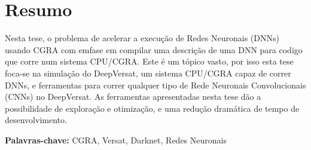 
\section*{Resumo}



Nesta tese, o problema de acelerar a execução de Redes Neuronais (DNNs) usando CGRA com emfase em compilar uma descrição de uma DNN para codigo que corre num sistema
CPU/CGRA. Este é um tópico vasto, por isso esta tese foca-se na simulação do DeepVersat, um sistema CPU/CGRA capaz de correr DNNs, e ferramentas para correr qualquer
tipo de Rede Neuronais Convolucionais (CNNs) no DeepVersat. As ferramentas apresentadas nesta tese dão a possibilidade de exploração e otimização, e uma redução dramática
de tempo de desenvolvimento.


\vfill

\textbf{\Large Palavras-chave:} CGRA, Versat, Darknet, Redes Neuronais

